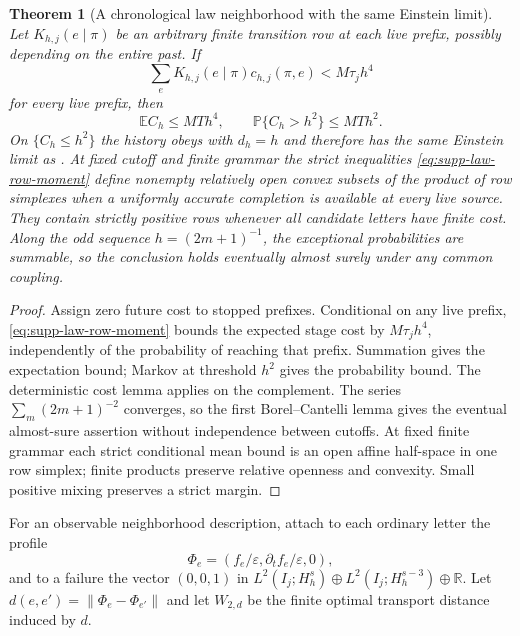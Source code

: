 \documentclass[11pt]{article}
\newtheorem{theorem}{Theorem}[section]
\numberwithin{equation}{section}
\theoremstyle{definition}
\theoremstyle{remark}
\begin{document}
\begin{theorem}[A chronological law neighborhood with the same Einstein limit]
\label{thm:supp-law-row-neighbourhood}
Let $K_{h,j}(e\mid\pi)$ be an arbitrary finite transition row at each live
prefix, possibly depending on the entire past.  If
\begin{equation}
 \sum_eK_{h,j}(e\mid\pi)c_{h,j}(\pi,e)<M\tau_jh^4
 \label{eq:supp-law-row-moment}
\end{equation}
for every live prefix, then
\begin{equation}
 \mathbb EC_h\le MTh^4,
 \qquad\mathbb P\{C_h>h^2\}\le MTh^2.
 \label{eq:supp-law-row-probability}
\end{equation}
On $\{C_h\le h^2\}$ the history obeys
 with $d_h=h$ and therefore has the same
Einstein limit as .  At fixed cutoff and finite
grammar the strict inequalities \eqref{eq:supp-law-row-moment} define
nonempty relatively open convex subsets of the product of row simplexes when
a uniformly accurate completion is available at every live source.  They
contain strictly positive rows whenever all candidate letters have finite
cost.  Along the odd sequence $h=(2m+1)^{-1}$, the exceptional probabilities
are summable, so the conclusion holds eventually almost surely under any
common coupling.
\end{theorem}
\begin{proof}
Assign zero future cost to stopped prefixes.  Conditional on any live prefix,
\eqref{eq:supp-law-row-moment} bounds the expected stage cost by
$M\tau_jh^4$, independently of the probability of reaching that prefix.
Summation gives the expectation bound; Markov at threshold $h^2$ gives the
probability bound.  The deterministic cost lemma applies on the complement.
The series $\sum_m(2m+1)^{-2}$ converges, so the first Borel--Cantelli lemma
gives the eventual almost-sure assertion without independence between
cutoffs.  At fixed finite grammar each strict conditional mean bound is an
open affine half-space in one row simplex; finite products preserve relative
openness and convexity.  Small positive mixing preserves a strict margin.
\end{proof}

For an observable neighborhood description, attach to each ordinary letter
the profile
\begin{equation}
 \Phi_e=(f_e/\varepsilon,\partial_tf_e/\varepsilon,0),
 \label{eq:supp-law-profile}
\end{equation}
and to a failure the vector $(0,0,1)$ in
$L^2(I_j;H_h^s)\oplus L^2(I_j;H_h^{s-3})\oplus\mathbb R$.  Let
$d(e,e')=\|\Phi_e-\Phi_{e'}\|$ and let $W_{2,d}$ be the finite optimal
transport distance induced by $d$.
\end{document}
